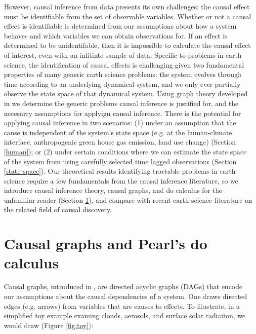 \documentclass[12pt]{article}
\begin{document}

However, causal inference from data presents its own challenges; the
causal effect must be identifiable from the set of observable
variables. Whether or not a causal effect is identifiable is
determined from our assumptions about how a system behaves and which
variables we can obtain observations for. If an effect is determined
to be unidentifable, then it is impossible to calculate the causal
effect of interest, even with an infitinte sample of data. Specific to
problems in earth science, the identification of causal effects is
challenging given two fundamental properties of many generic earth
science problems: the system evolves through time according to an
underlying dynamical system, and we only ever partially observe the
state space of that dynamical system. Using graph theory developed in
\citep{pearl1995causal} we determine the generic problems causal
inference is justified for, and the necesarry assumptions for applyign
causal inference. There is the potential for applying causal inference
in two scenarios: (1) under an assumption that the cause is
independent of the system's state space (e.g. at the human-climate
interface, anthropogenic green house gas emission, land use change)
(Section \ref{human}); or (2) under certain conditions where we can
estimate the state space of the system from using carefully selected
time lagged observations (Section \ref{state-space}).  Our theoretical
results identifying tractable problems in earth science require a few
fundamentals from the causal inference literature, so we introduce
causal inference theory, causal graphs, and do calculus for the
unfamiliar reader (Section \ref{sec:causal-graphs-pearls}), and
compare with recent earth science literature on the related field of
causal discovery.


\section{Causal graphs and Pearl's do calculus}
\label{sec:causal-graphs-pearls}

Causal graphs, introduced in \citep{pearl1995causal}, are directed
acyclic graphs (DAGs) that encode our assumptions about the causal
dependencies of a system. One draws directed edges (e.g. arrows)
from variables that are causes to effects. To illustrate, in a
simplified toy example examing clouds, aerosols, and surface solar
radiation, we would draw (Figure \ref{fig:toy}):
\end{document}

